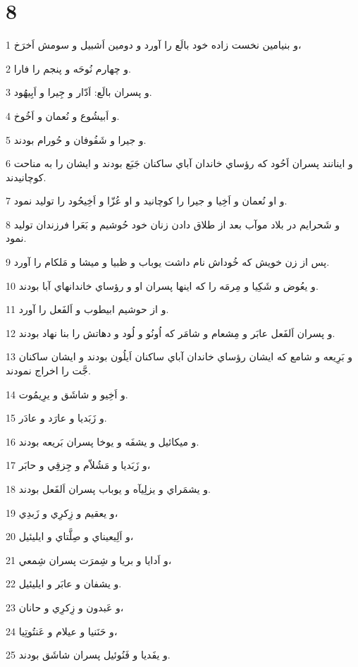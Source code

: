 \chapter{8}

\par 1 و بنيامين نخست زاده خود بالَع را آورد و دومين اَشبيل و سومش اَخرَخ،
\par 2 و چهارم نُوحَه و پنجم را فارا.
\par 3 و پسران بالَع: اَدّار و جِيرا و اَبِيهُود.
\par 4 و اَبيشُوع و نُعمان و اَخُوخ.
\par 5 و جيرا و شَفُوفان و حُورام بودند.
\par 6 و اينانند پسران اَحُود که رؤساي خاندان آباي ساکنان جَبَع بودند و ايشان را به مناحت کوچانيدند.
\par 7 و او نُعمان و اَخِيا و جيرا را کوچانيد و او عُزّا و اَخِيحُود را توليد نمود.
\par 8 و شَحرايم در بلاد موآب بعد از طلاق دادن زنان خود حُوشيم و بَعَرا فرزندان توليد نمود.
\par 9 پس از زن خويش که خُوداش نام داشت يوباب و ظبيا و ميشا و مَلکام را آورد.
\par 10 و يعُوض و شَکِيا و مِرمَه را که اينها پسران او و رؤساي خاندانهاي آبا بودند.
\par 11 و از حوشيم ابيطوب و اَلفَعل را آورد.
\par 12 و پسران اَلفَعل عابَر و مِشعام و شامَر که اُونُو و لُود و دهاتش را بنا نهاد بودند.
\par 13 و بَرِيعه و شامع که ايشان رؤساي خاندان آباي ساکنان اَيلُون بودند و ايشان ساکنان جَّت را اخراج نمودند.
\par 14 و اَخِيو و شاشَق و يرِيمُوت.
\par 15 و زَبَديا و عارَد و عادَر.
\par 16 و ميکائيل و يشفَه و يوخا پسران بَريعه بودند.
\par 17 و زَبَديا و مَشُلاّم و جِزقِي و حابَر،
\par 18 و يشمَراي و يزلِيآه و يوباب پسران اَلفَعل بودند.
\par 19 و يعقيم و زِکرِي و زَبدِي،
\par 20 و اَلِيعيناي و صِلَّتاي و ايليئيل،
\par 21 و اَدايا و بريا و شِمرَت پسران شِمعي،
\par 22 و يشفان و عابَر و ايليئيل.
\par 23 و عَبدون و زِکرِي و حانان،
\par 24 و حَنَنيا و عيلام و عَنتُوتِيا،
\par 25 و يفَديا و فَنُوئيل پسران شاشَق بودند.
